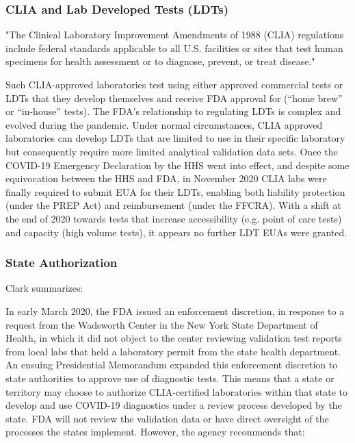         \subsubsection{CLIA and Lab Developed Tests (LDTs)}

            "The Clinical Laboratory Improvement Amendments of 1988 (CLIA) regulations include federal standards applicable to all U.S. facilities or sites that test human specimens for health assessment or to diagnose, prevent, or treat disease."~\cite{CDCCLIA}

            Such CLIA-approved laboratories test using either approved commercial tests or LDTs that they develop themselves and receive FDA approval for (“home brew” or “in-house” tests). The FDA’s relationship to regulating LDTs is complex and evolved during the pandemic. Under normal circumstances, CLIA approved laboratories can develop LDTs that are limited to use in their specific laboratory but consequently require more limited analytical validation data sets. Once the COVID-19 Emergency Declaration by the HHS went into effect, and despite some equivocation between the HHS and FDA, in November 2020 CLIA labs were finally required to submit EUA for their LDTs, enabling both liability protection (under the PREP Act) and reimbursement (under the FFCRA). With a shift at the end of 2020 towards tests that increase accessibility (e.g. point of care tests) and capacity (high volume tests), it appears no further LDT EUAs were granted.

        \subsubsection{State Authorization}

            Clark summarizes:\cite{Clark2020}

            In early March 2020, the FDA issued an enforcement discretion, in response to a request from the Wadsworth Center in the New York State Department of Health, in which it did not object to the center reviewing validation test reports from local labs that held a laboratory permit from the state health department.\cite{FDA20200313} An ensuing Presidential Memorandum expanded this enforcement discretion to state authorities to approve use of diagnostic tests.\cite{Trump2020} This means that a state or territory may choose to authorize CLIA-certified laboratories within that state to develop and use COVID-19 diagnostics under a review process developed by the state. FDA will not review the validation data or have direct oversight of the processes the states implement. However, the agency recommends that:
            

